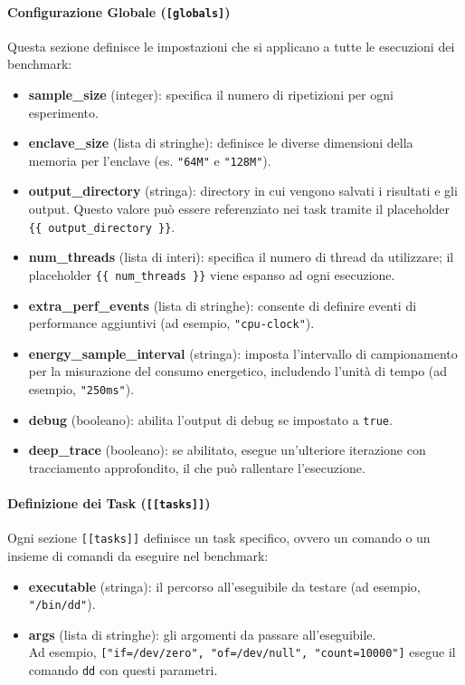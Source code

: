 \documentclass{article}
\begin{document}
\paragraph{Configurazione Globale (\texttt{[globals]})}
Questa sezione definisce le impostazioni che si applicano a tutte le esecuzioni dei benchmark:
\begin{itemize}
  \item \textbf{sample\_size} (integer): specifica il numero di ripetizioni per ogni esperimento.
  \item \textbf{enclave\_size} (lista di stringhe): definisce le diverse dimensioni della memoria per l'enclave (es. \texttt{"64M"} e \texttt{"128M"}).
  \item \textbf{output\_directory} (stringa): directory in cui vengono salvati i risultati e gli output. Questo valore può essere referenziato nei task tramite il placeholder \texttt{\{\{ output\_directory \}\}}.
  \item \textbf{num\_threads} (lista di interi): specifica il numero di thread da utilizzare; il placeholder \texttt{\{\{ num\_threads \}\}} viene espanso ad ogni esecuzione.
  \item \textbf{extra\_perf\_events} (lista di stringhe): consente di definire eventi di performance aggiuntivi (ad esempio, \texttt{"cpu-clock"}).
  \item \textbf{energy\_sample\_interval} (stringa): imposta l'intervallo di campionamento per la misurazione del consumo energetico, includendo l'unità di tempo (ad esempio, \texttt{"250ms"}).
  \item \textbf{debug} (booleano): abilita l'output di debug se impostato a \texttt{true}.
  \item \textbf{deep\_trace} (booleano): se abilitato, esegue un'ulteriore iterazione con tracciamento approfondito, il che può rallentare l'esecuzione.
\end{itemize}

\paragraph{Definizione dei Task (\texttt{[[tasks]]})}
Ogni sezione \texttt{[[tasks]]} definisce un task specifico, ovvero un comando o un insieme di comandi da eseguire nel benchmark:
\begin{itemize}
  \item \textbf{executable} (stringa): il percorso all'eseguibile da testare (ad esempio, \texttt{"/bin/dd"}).
  \item \textbf{args} (lista di stringhe): gli argomenti da passare all'eseguibile.\\
  Ad esempio, \texttt{["if=/dev/zero", "of=/dev/null", "count=10000"]} esegue il comando \texttt{dd} con questi parametri.
\end{itemize}
\end{document}

